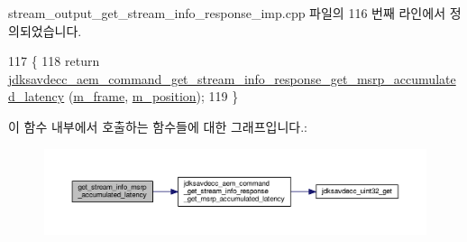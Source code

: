 stream\+\_\+output\+\_\+get\+\_\+stream\+\_\+info\+\_\+response\+\_\+imp.\+cpp 파일의 116 번째 라인에서 정의되었습니다.


\begin{DoxyCode}
117 \{
118     \textcolor{keywordflow}{return} 
      \hyperlink{group__command__get__stream__info__response_gadb7c867b9a119e2954e0571040afbf73}{jdksavdecc\_aem\_command\_get\_stream\_info\_response\_get\_msrp\_accumulated\_latency}
      (\hyperlink{classavdecc__lib_1_1stream__output__get__stream__info__response__imp_a50417969cf438e7c8d698726bbbe2ff9}{m\_frame}, \hyperlink{classavdecc__lib_1_1stream__output__get__stream__info__response__imp_af5e691c4a8a0feb07f48440b321206cd}{m\_position});
119 \}
\end{DoxyCode}


이 함수 내부에서 호출하는 함수들에 대한 그래프입니다.\+:
\nopagebreak
\begin{figure}[H]
\begin{center}
\leavevmode
\includegraphics[width=350pt]{classavdecc__lib_1_1stream__output__get__stream__info__response__imp_a28cc44ebba58da58b64ee18da7b0af8e_cgraph}
\end{center}
\end{figure}


